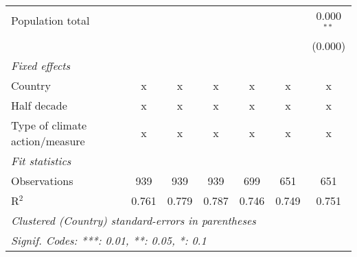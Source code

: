 \begin{tabular}{lcccccc}
   Population total                                                     &         &                &                &                &                & 0.000$^{**}$\\   
                                                                        &         &                &                &                &                & (0.000)\\   
   \emph{Fixed effects}\\
   Country                                                              & x       & x              & x              & x              & x              & x\\  
   Half decade                                                          & x       & x              & x              & x              & x              & x\\  
   Type of climate action/measure                                       & x       & x              & x              & x              & x              & x\\  
   \midrule \emph{Fit statistics}\\
   Observations                                                         & 939     & 939            & 939            & 699            & 651            & 651\\  
   R$^2$                                                                & 0.761   & 0.779          & 0.787          & 0.746          & 0.749          & 0.751\\  
   \midrule
   \multicolumn{7}{l}{\emph{Clustered (Country) standard-errors in parentheses}}\\
   \multicolumn{7}{l}{\emph{Signif. Codes: ***: 0.01, **: 0.05, *: 0.1}}\\
\end{tabular}
\par\endgroup


